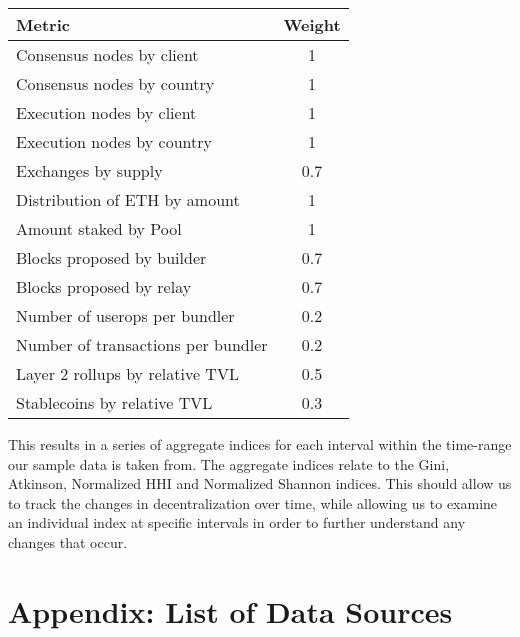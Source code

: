 \documentclass[conference]{IEEEtran}
\begin{document}
\vspace{12pt}

\begin{table}[h]
\normalsize
\begin{center}
\begin{tabular}{|l|c|}
\hline
\textbf{Metric} & \textbf{Weight} \\ \hline
Consensus nodes by client & 1 \\ \hline
Consensus nodes by country & 1 \\ \hline
Execution nodes by client & 1 \\ \hline
Execution nodes by country & 1 \\ \hline
Exchanges by supply & 0.7 \\ \hline
Distribution of ETH by amount & 1 \\ \hline
Amount staked by Pool & 1 \\ \hline
Blocks proposed by builder & 0.7 \\ \hline
Blocks proposed by relay & 0.7 \\ \hline
Number of userops per bundler & 0.2 \\ \hline
Number of transactions per bundler & 0.2 \\ \hline
Layer 2 rollups by relative TVL & 0.5 \\ \hline
Stablecoins by relative TVL & 0.3 \\ \hline
\end{tabular}
\end{center}
\end{table}

\vspace{6pt}

This results in a series of aggregate indices for each interval within the time-range our sample data is taken from.  The aggregate indices relate to the Gini, Atkinson, Normalized HHI and Normalized Shannon indices.  This should allow us to track the changes in decentralization over time, while allowing us to examine an individual index at specific intervals in order to further understand any changes that occur.

\printbibliography

\newpage

\onecolumn

\section{Appendix: List of Data Sources}
\end{document}

